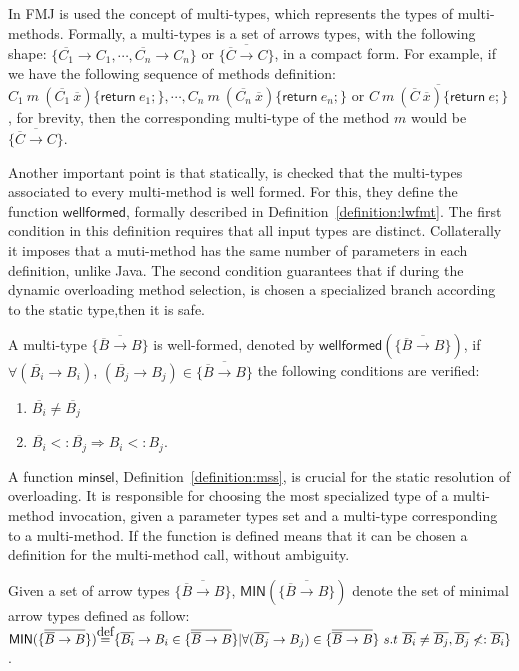\documentclass[hidelinks, twocolumn]{article}
\newcommand\myeq{\stackrel{\mathclap{\normalfont\mbox{def}}}{=}}
\newcommand{\metodo}[1][C]{#1 \ m \ (\overline{#1} \ \overline{x})\{\mathsf{return} \ e;\}}
\newcommand{\metodoV}[1]{C_{#1} \ m \ (\overline{C_{#1}} \ \overline{x})\{\mathsf{return} \ e_{#1};\}}
\newcommand{\wellformed}[1][B]{\mathsf{wellformed} (\{\overline {\overline{#1} \to #1}\})}
\newcommand{\multt}[1][B]{\{ \overline{\overline{#1} \to #1} \}}
\begin{document}
In FMJ is used the concept of multi-types, which represents the types of  multi-methods. Formally, a multi-types is a set of arrows types, with the following shape: $\{ \overline{C_1} \to C_1,  \cdots ,  \overline{C_n} \to C_n\}$ or $\{\overline{ \overline{C} \to C}\}$, in a compact form. For example, if we have the following sequence of methods definition: \\
$\metodoV{1}, \cdots , \metodoV{n}$ or  $\overline{\metodo[C]}$, 
for brevity, then the corresponding multi-type of the method $m$ would be  $\{\overline{ \overline{C} \to C}\}$.

Another important point is that statically, is checked that the multi-types associated to every multi-method is well formed. For this, they define  the function  $\mathsf{wellformed}$, formally described in Definition~\ref{definition:lwfmt}. The first condition in this definition requires  that all input types are distinct. Collaterally it imposes that a muti-method has the same number of parameters in each definition, unlike Java. The second condition guarantees that if during the dynamic overloading method selection, is chosen a specialized branch according to the static type,then it is safe.

\begin{definition}
\label{definition:lwfmt}
\mbox{}
A multi-type $\multt$ is well-formed, denoted by $\wellformed$, if $\forall(\overline{B_i} \to B_i)$, $(\overline{B_j} \to B_j) \in \multt$ the following conditions are verified:
\begin{enumerate}[1.]
    \item $\overline{B_i} \neq \overline{B_j}$
    \item $\overline{B_i} <: \overline{B_j} \Rightarrow B_i <: B_j$.
   \end{enumerate}
\end{definition}

A function $\mathsf{minsel}$, Definition~\ref{definition:mss}, is crucial for the static  resolution of overloading. It is responsible for choosing the most specialized type of a multi-method invocation, given a parameter types set and a multi-type corresponding to a multi-method. If the function is defined means that it can be chosen a definition for the multi-method call, without ambiguity.

\begin{definition}
\label{definition:smt}
\mbox{}
Given a set of arrow types $\multt$, $\mathsf{MIN}(\multt)$ denote the set of minimal arrow types defined as follow: $\mathsf{MIN}(\multt) \myeq \{\overline{B_i} \to B_i \in \multt| \forall(\overline{B_j} \to B_j) \in \multt \ s.t \ \overline{B_i}\neq \overline{B_j} , \overline{B_j} \not<: \overline{B_i} \}$.
\end{definition}
\end{document}
